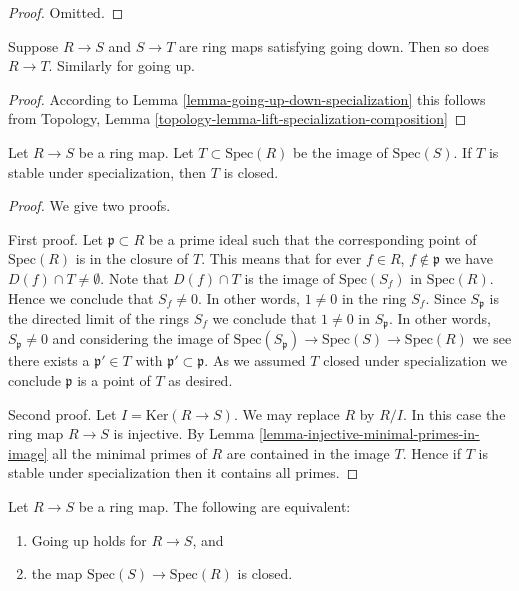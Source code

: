 \begin{proof}
Omitted.
\end{proof}

\begin{lemma}
\label{lemma-going-up-down-composition}
Suppose $R \to S$ and $S \to T$ are ring maps satisfying
going down. Then so does $R \to T$. Similarly for going up.
\end{lemma}

\begin{proof}
According to Lemma \ref{lemma-going-up-down-specialization}
this follows from
Topology, Lemma \ref{topology-lemma-lift-specialization-composition}
\end{proof}

\begin{lemma}
\label{lemma-image-stable-specialization-closed}
Let $R \to S$ be a ring map. Let $T \subset \text{Spec}(R)$
be the image of $\text{Spec}(S)$. If $T$ is stable under specialization,
then $T$ is closed.
\end{lemma}

\begin{proof}
We give two proofs.

\medskip\noindent
First proof. Let $\mathfrak p \subset R$ be a prime ideal such that
the corresponding point of $\text{Spec}(R)$ is in the closure
of $T$. This means that for ever $f \in R$, $f \not \in \mathfrak p$
we have $D(f) \cap T \not = \emptyset$. Note that $D(f) \cap T$
is the image of $\text{Spec}(S_f)$ in $\text{Spec}(R)$. Hence
we conclude that $S_f \not = 0$. In other words, $1 \not = 0$ in
the ring $S_f$. Since $S_{\mathfrak p}$ is the directed limit
of the rings $S_f$ we conclude that $1 \not = 0$ in
$S_{\mathfrak p}$. In other words, $S_{\mathfrak p} \not = 0$ and
considering the image of $\text{Spec}(S_{\mathfrak p})
\to \text{Spec}(S) \to \text{Spec}(R)$ we see there exists
a $\mathfrak p' \in T$ with $\mathfrak p' \subset \mathfrak p$.
As we assumed $T$ closed under specialization we conclude $\mathfrak p$
is a point of $T$ as desired.

\medskip\noindent
Second proof. Let $I = \text{Ker}(R \to S)$. We may replace $R$ by $R/I$.
In this case the ring map $R \to S$ is injective.
By Lemma \ref{lemma-injective-minimal-primes-in-image}
all the minimal primes of $R$ are contained in the image $T$. Hence
if $T$ is stable under specialization then it contains all primes.
\end{proof}

\begin{lemma}
\label{lemma-going-up-closed}
Let $R \to S$ be a ring map. The following are equivalent:
\begin{enumerate}
\item Going up holds for $R \to S$, and
\item the map $\text{Spec}(S) \to \text{Spec}(R)$ is closed.
\end{enumerate}
\end{lemma}

